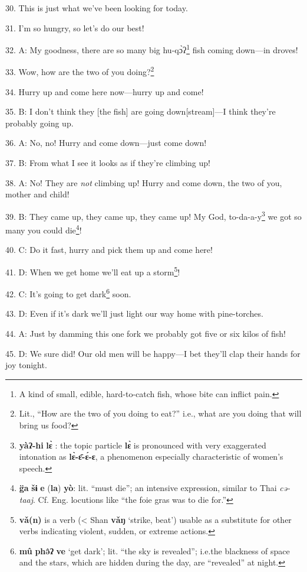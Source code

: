 30. This is just what we've been looking for today.

31. I'm so hungry, so let's do our best!

32. A: My goodness, there are so many big hu-qɔ̀ʔ\footnote{A kind of small, edible, hard-to-catch fish, whose bite can inflict pain.} fish coming down---in
droves!

33. Wow, how are the two of you doing?\footnote{Lit., ``How are the two of you doing to eat?'' i.e., what are you doing that will bring us food?}

34. Hurry up and come here now---hurry up and come!

35. B: I don't think they [the fish] are going down[stream]---I think they're probably
going up.

36. A: No, no! Hurry and come down---just come down!

37. B: From what I see it looks as if they're climbing up!

38. A: No! They are \textit{not} climbing up! Hurry and come down, the two of you,
mother and child!

39. B: They came up, they came up, they came up! My God, to-da-a-y\footnote{\textbf{yàʔ-hi} \textbf{lɛ̀} : the topic particle \textbf{lɛ̀} is pronounced with very exaggerated intonation as \textbf{lɛ̀-ɛ̄-ɛ́-ɛ}, a phenomenon especially characteristic of women's speech.} we got
so many you could die\footnote{\textbf{g̈a} \textbf{šɨ} \textbf{e} (\textbf{la}) \textbf{yò}: lit. ``must die''; an intensive expression, similar to Thai \textit{cə-taaj}. Cf. Eng. locutions like ``the foie gras was to die for.''}!

40. C: Do it fast, hurry and pick them up and come here!

41. D: When we get home we'll eat up a storm\footnote{\textbf{vǎ(n)} is a verb (< Shan \textbf{vǎŋ} `strike, beat') usable as a substitute for other verbs indicating violent, sudden, or extreme actions.}!

42. C: It's going to get dark\footnote{\textbf{mû} \textbf{phə̂ʔ} \textbf{ve} `get dark'; lit. ``the sky is revealed''; i.e.the blackness of space and the stars, which are hidden during the day, are ``revealed'' at night.} soon.

43. D: Even if it's dark we'll just light our way home with pine-torches.

44. A: Just by damming this one fork we probably got five or six kilos of fish!

45. D: We sure did! Our old men will be happy---I bet they'll clap their hands
for joy tonight.

